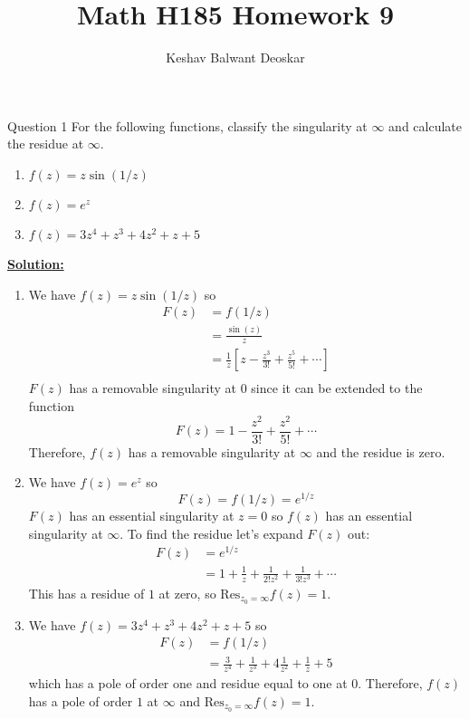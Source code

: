 \documentclass{article}
\title{Math H185 Homework 9}
\author{Keshav Balwant Deoskar}
\begin{document}
\maketitle



\begin{mathdefinitionbox}{Question 1}
\vskip 0.5cm
For the following functions, classify the singularity at $\infty$ and calculate the residue at $\infty$.
\begin{enumerate}[label=(\alph*)]
  \item $f(z) = z\sin(1/z)$
  \item $f(z) = e^z$
  \item $f(z) = 3z^4 + z^3 + 4z^2 + z + 5$
\end{enumerate}
\end{mathdefinitionbox}

\vskip 0.5cm
\underline{\textbf{Solution:}}

\begin{enumerate}[label=(\alph*)]
  \item We have $f(z) = z\sin(1/z)$ so 
  \begin{align*}
    F(z) &= f(1/z) \\
    &= \frac{\sin(z)}{z} \\
    &= \frac{1}{z} \left[z - \frac{z^3}{3!} + \frac{z^5}{5!} + \cdots \right] \\
  \end{align*}
  $F(z)$ has a removable singularity at $0$ since it can be extended to the function 
  \[ F(z) = 1 - \frac{z^2}{3!} + \frac{z^2}{5!} + \cdots \] Therefore, $f(z)$ has a removable singularity at $\infty$ and the residue is zero.

  \vskip 0.5cm
  \item We have $f(z) = e^z$ so 
  \[ F(z) = f(1/z) = e^{1/z} \]
  $F(z)$ has an essential singularity at $z = 0$ so $f(z)$ has an essential singularity at $\infty$. To find the residue let's expand $F(z)$ out:
  \begin{align*}
    F(z) &= e^{1/z} \\
    &= 1 + \frac{1}{z} + \frac{1}{2!z^2} + \frac{1}{3!z^3} + \cdots 
  \end{align*}
  This has a residue of $1$ at zero, so $\mathrm{Res}_{z_0 = \infty}f(z) = 1$.

  \vskip 0.5cm
  \item We have $f(z) = 3z^4 + z^3 + 4z^2 + z + 5$ so 
  \begin{align*}
    F(z) &= f(1/z) \\
    &= \frac{3}{z^4} + \frac{1}{z^3} + 4\frac{1}{z^2} + \frac{1}{z} + 5 
  \end{align*}
  which has a pole of order one and residue equal to one at $0$. Therefore, $f(z)$ has a pole of order $1$ at $\infty$ and $\mathrm{Res}_{z_0 = \infty} f(z) = 1$.
\end{enumerate}
\end{document}
